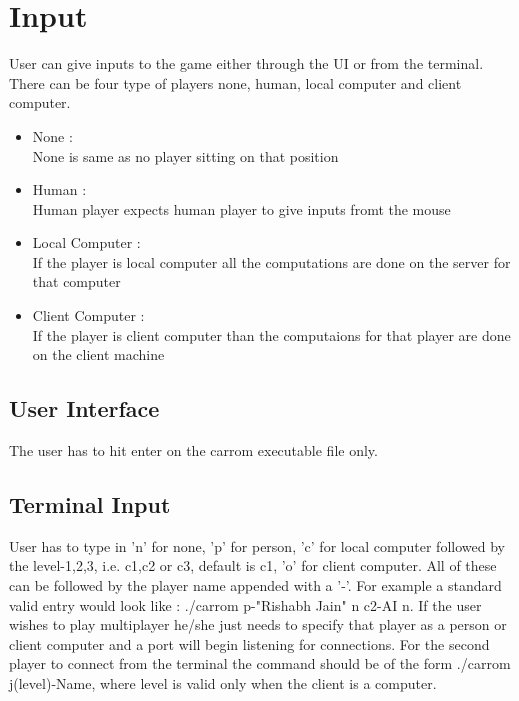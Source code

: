 \documentclass[11pt,a4paper,oneside]{report}
\begin{document}
\section{Input}
User can give inputs to the game either through the UI or from the terminal.
There can be four type of players none, human, local computer and client computer.
\begin{itemize}
\item{None :\\None is same as no player sitting on that position}
\item{Human :\\Human player expects human player to give inputs fromt the mouse}
\item{Local Computer :\\If the player is local computer all the computations are done on the server for that computer}
\item{Client Computer :\\If the player is client computer than the computaions for that player are done on the client machine}
\end{itemize}
\subsection{User Interface}
The user has to hit enter on the carrom executable file only.
\subsection{Terminal Input}
User has to type in 'n' for none, 'p' for person, 'c' for local computer followed by the level-1,2,3, i.e. c1,c2 or c3, default is c1, 'o' for client computer. All of these can be followed by the player name appended with a '-'. For example a standard valid entry would look like : ./carrom p-"Rishabh Jain" n c2-AI n.
If the user wishes to play  multiplayer he/she just needs to specify that player as a person or client computer and a port will begin listening for connections. For the second player to connect from the terminal the command should be of the form ./carrom j(level)-Name, where level is valid only when the client is a computer.

\newpage
\end{document}

